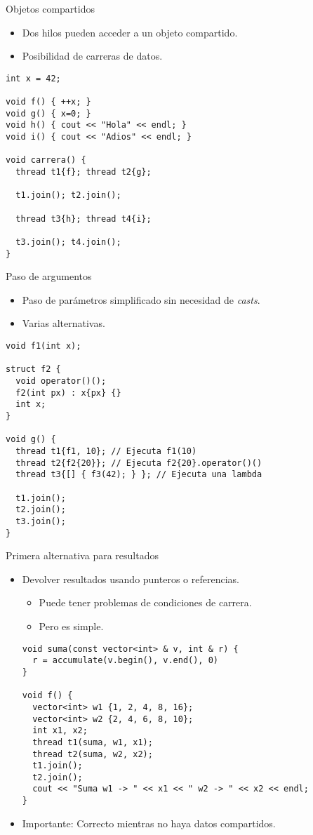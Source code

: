 \begin{frame}[fragile]{Objetos compartidos}
\begin{itemize}
  \item Dos hilos pueden acceder a un objeto compartido.
  \item Posibilidad de carreras de datos.
\end{itemize}
\begin{lstlisting}
int x = 42;

void f() { ++x; }
void g() { x=0; }
void h() { cout << "Hola" << endl; }
void i() { cout << "Adios" << endl; }

void carrera() {
  thread t1{f}; thread t2{g};

  t1.join(); t2.join();

  thread t3{h}; thread t4{i};

  t3.join(); t4.join();
}
\end{lstlisting}
\end{frame}

\begin{frame}[fragile]{Paso de argumentos}
\begin{itemize}
  \item Paso de parámetros simplificado sin necesidad de \emph{casts}.
  \item Varias alternativas.
\end{itemize}
\begin{lstlisting}
void f1(int x);

struct f2 {
  void operator()();
  f2(int px) : x{px} {}
  int x;
}

void g() {
  thread t1{f1, 10}; // Ejecuta f1(10)
  thread t2{f2{20}}; // Ejecuta f2{20}.operator()()
  thread t3{[] { f3(42); } }; // Ejecuta una lambda

  t1.join();
  t2.join();
  t3.join();
}
\end{lstlisting}
\end{frame}

\begin{frame}[fragile]{Primera alternativa para resultados}
\begin{itemize}
  \item Devolver resultados usando punteros o referencias.
  \begin{itemize}
    \item Puede tener problemas de condiciones de carrera.
    \item Pero es simple.
  \end{itemize}
\begin{lstlisting}
void suma(const vector<int> & v, int & r) {
  r = accumulate(v.begin(), v.end(), 0)
}

void f() {
  vector<int> w1 {1, 2, 4, 8, 16};
  vector<int> w2 {2, 4, 6, 8, 10};
  int x1, x2;
  thread t1(suma, w1, x1);
  thread t2(suma, w2, x2);
  t1.join();
  t2.join();
  cout << "Suma w1 -> " << x1 << " w2 -> " << x2 << endl;
}
\end{lstlisting}
  \item \alert{Importante}: Correcto mientras no haya datos compartidos.
\end{itemize}
\end{frame}

